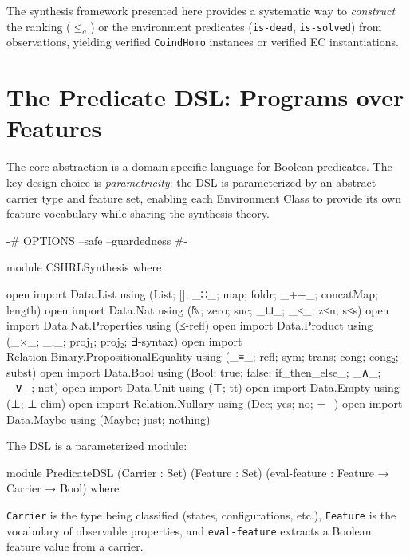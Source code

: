 \documentclass[9pt,a4paper]{article}
\theoremstyle{plain}
\theoremstyle{definition}
\theoremstyle{remark}
\begin{document}
\noindent The synthesis framework presented here provides a systematic way to \emph{construct} the ranking ($\le_a$) or the environment predicates (\texttt{is-dead}, \texttt{is-solved}) from observations, yielding verified \texttt{CoindHomo} instances or verified EC instantiations.


\section{The Predicate DSL: Programs over Features}
\label{sec:dsl}

The core abstraction is a domain-specific language for Boolean predicates.  The key design choice is \emph{parametricity}: the DSL is parameterized by an abstract carrier type and feature set, enabling each Environment Class to provide its own feature vocabulary while sharing the synthesis theory.

\begin{code}
{-# OPTIONS --safe --guardedness #-}

module CSHRLSynthesis where

open import Data.List using (List; []; _∷_; map; foldr; _++_; concatMap; length)
open import Data.Nat using (ℕ; zero; suc; _⊔_; _≤_; z≤n; s≤s)
open import Data.Nat.Properties using (≤-refl)
open import Data.Product using (_×_; _,_; proj₁; proj₂; ∃-syntax)
open import Relation.Binary.PropositionalEquality
  using (_≡_; refl; sym; trans; cong; cong₂; subst)
open import Data.Bool using (Bool; true; false; if_then_else_; _∧_; _∨_; not)
open import Data.Unit using (⊤; tt)
open import Data.Empty using (⊥; ⊥-elim)
open import Relation.Nullary using (Dec; yes; no; ¬_)
open import Data.Maybe using (Maybe; just; nothing)
\end{code}

The DSL is a parameterized module:

\begin{code}
module PredicateDSL
  (Carrier : Set)
  (Feature : Set)
  (eval-feature : Feature → Carrier → Bool)
  where
\end{code}

\noindent \texttt{Carrier} is the type being classified (states, configurations, etc.), \texttt{Feature} is the vocabulary of observable properties, and \texttt{eval-feature} extracts a Boolean feature value from a carrier.
\end{document}
